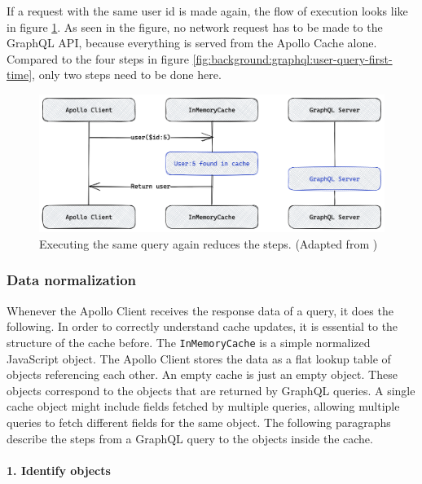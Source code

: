 \noindent If a request with the same user id is made again, the flow of execution looks like in figure \ref{fig:background:graphql:user-query-second-time}. As seen in the figure, no network request has to be made to the GraphQL API, because everything is served from the Apollo Cache alone. Compared to the four steps in figure \ref{fig:background:graphql:user-query-first-time}, only two steps need to be done here. \cite{misc:-:background:graphql:apollo-client-cache-overview}

\ifshowImages
\begin{figure}[H]
    \centering
    \includegraphics[width=0.7\linewidth]{images/background/apollo/apollo-client-basic-cache-warm.png}
    \caption{Executing the same query again reduces the steps. (Adapted from \cite{misc:-:background:graphql:apollo-client-cache-overview})}\label{fig:background:graphql:user-query-second-time}
\end{figure}
\fi

\subsubsection{Data normalization}\label{subsubsection:background:graphql:apollo-server-client:data-normalization}

Whenever the Apollo Client receives the response data of a query, it does the following. In order to correctly understand cache updates, it is essential to the structure of the cache before. The \texttt{InMemoryCache} is a simple normalized JavaScript object. The Apollo Client stores the data as a flat lookup table of objects referencing each other. An empty cache is just an empty object. These objects correspond to the objects that are returned by GraphQL queries. A single cache object might include fields fetched by multiple queries, allowing multiple queries to fetch different fields for the same object. \cite{misc:-:background:graphql:apollo-client-cache-overview} The following paragraphs describe the steps from a GraphQL query to the objects inside the cache.

\paragraph{1. Identify objects}\label{paragraph:background:graphql:apollo-server-client:data-normalization:identify-objects}

